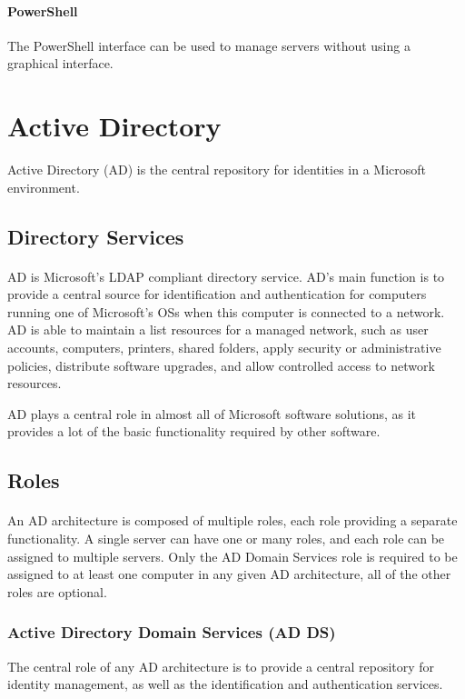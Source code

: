 \paragraph{PowerShell}
The PowerShell interface can be used to manage servers without using a graphical interface.


\section{Active Directory}

Active Directory (AD) is the central repository for identities in a Microsoft environment.

\subsection{Directory Services}
\paragraph{}
AD is Microsoft's LDAP compliant directory service. AD's main function is to provide a central source for identification and authentication for computers running one of Microsoft's OSs when this computer is connected to a network. AD is able to maintain a list resources for a managed network, such as user accounts, computers, printers, shared folders, apply security or administrative policies, distribute software upgrades, and allow controlled access to network resources.

AD plays a central role in almost all of Microsoft software solutions, as it provides a lot of the basic functionality required by other software\cite{desmond_active_2008}.


\subsection{Roles}
\paragraph{}
An AD architecture is composed of multiple roles, each role providing a separate functionality. A single server can have one or many roles, and each role can be assigned to multiple servers. Only the AD Domain Services role is required to be assigned to at least one computer in any given AD architecture, all of the other roles are optional.\cite[p. 5-7]{holme_self-paced_2011}

\subsubsection{Active Directory Domain Services (AD DS)}
The central role of any AD architecture is to provide a central repository for identity management, as well as the identification and authentication services.

